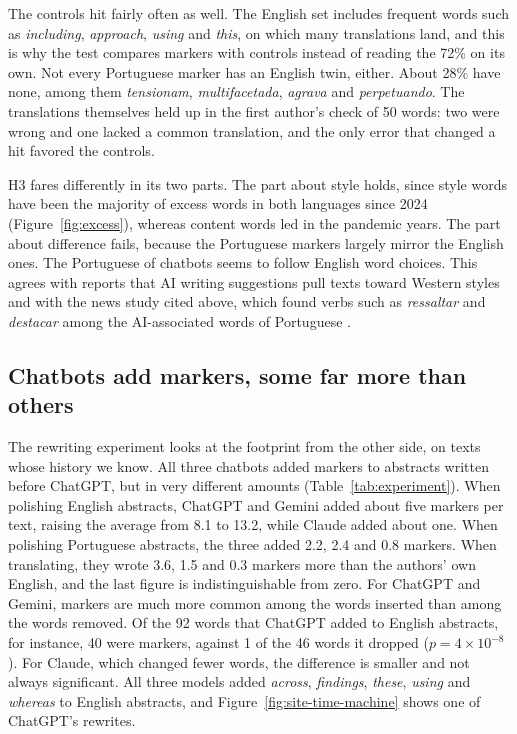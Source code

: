 \documentclass[12pt]{article}
\newcommand{\w}[1]{\textit{#1}}
\begin{document}
The controls hit fairly often as well. The English set includes frequent words such as
\w{including}, \w{approach}, \w{using} and \w{this}, on which many translations land, and this is
why the test compares markers with controls instead of reading the 72\% on its own. Not every
Portuguese marker has an English twin, either. About 28\% have none, among them \w{tensionam},
\w{multifacetada}, \w{agrava} and \w{perpetuando}. The translations themselves held up in the first
author's check of 50 words: two were wrong and one lacked a common translation, and the only error
that changed a hit favored the controls.

H3 fares differently in its two parts. The part about style holds, since style words have been the
majority of excess words in both languages since 2024 (Figure~\ref{fig:excess}), whereas content
words led in the pandemic years. The part about difference fails, because the Portuguese markers
largely mirror the English ones. The Portuguese of chatbots seems to follow English word choices.
This agrees with reports that AI writing suggestions pull texts toward Western styles
\cite{agarwal2025homogenize} and with the news study cited above, which found verbs such as
\w{ressaltar} and \w{destacar} among the AI-associated words of Portuguese
\cite{juzek2026crosslingual}.

\subsection{Chatbots add markers, some far more than others}
\label{sec:experiment}

The rewriting experiment looks at the footprint from the other side, on texts whose history we
know. All three chatbots added markers to abstracts written before ChatGPT, but in very different
amounts (Table~\ref{tab:experiment}). When polishing English abstracts, ChatGPT and Gemini added
about five markers per text, raising the average from 8.1 to 13.2, while Claude added about one.
When polishing Portuguese abstracts, the three added 2.2, 2.4 and 0.8 markers. When translating,
they wrote 3.6, 1.5 and 0.3 markers more than the authors' own English, and the last figure is
indistinguishable from zero. For ChatGPT and Gemini, markers are much more common among the words
inserted than among the words removed. Of the 92 words that ChatGPT added to English abstracts, for
instance, 40 were markers, against 1 of the 46 words it dropped ($p = 4 \times 10^{-8}$). For
Claude, which changed fewer words, the difference is smaller and not always significant. All three
models added \w{across}, \w{findings}, \w{these}, \w{using} and \w{whereas} to English abstracts,
and Figure~\ref{fig:site-time-machine} shows one of ChatGPT's rewrites.
\end{document}
